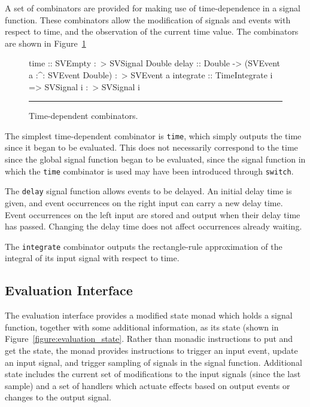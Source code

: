 \documentclass[draft]{llncs}
\begin{document}
A set of combinators are provided for making use of time-dependence in a signal
function. These combinators allow the modification of signals and events with
respect to time, and the observation of the current time value. The combinators
are shown in Figure~\ref{figure:time_combinators}

\begin{figure}
\begin{code}
time      :: SVEmpty :~> SVSignal Double
delay     :: Double -> (SVEvent a :^: SVEvent Double) :~> SVEvent a
integrate :: TimeIntegrate i => SVSignal i :~> SVSignal i
\end{code}
\hrule
\caption{Time-dependent combinators.}
\label{figure:time_combinators}
\end{figure}

The simplest time-dependent combinator is {\tt time}, which simply outputs
the time since it began to be evaluated. This does not necessarily correspond to
the time since the global signal function began to be evaluated, since the
signal function in which the {\tt time} combinator is used may have been
introduced through {\tt switch}.

The {\tt delay} signal function allows events to be delayed. An initial delay
time is given, and event occurrences on the right input can carry a new delay
time. Event occurrences on the left input are stored and output when their delay
time has passed. Changing the delay time does not affect occurrences already
waiting.

The {\tt integrate} combinator outputs the rectangle-rule approximation of the
integral of its input signal with respect to time.

\subsection{Evaluation Interface}
\label{subsection:System_Design_and_Interface-Evaluation_Interface}

The evaluation interface provides a modified state monad which holds a signal
function, together with some additional information, as its state (shown in Figure~\ref{figure:evaluation_state}.
Rather than monadic instructions to put and get the state, the monad provides instructions
to trigger an input event, update an input signal, and trigger sampling of
signals in the signal function. Additional state includes the current set of
modifications to the input signals (since the last sample) and a set of
handlers which actuate effects based on output events or changes to the output
signal.
\end{document}

